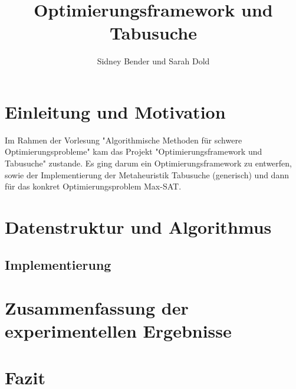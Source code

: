 \documentclass{article}
\begin{document}
\title{Optimierungsframework und Tabusuche}

\author{Sidney Bender und Sarah Dold}

\maketitle
\tableofcontents{}









\section{Einleitung und Motivation}
Im Rahmen der Vorlesung "Algorithmische Methoden für schwere Optimierungsprobleme" kam das Projekt "Optimierungsframework und Tabusuche" zustande.
Es ging darum ein Optimierungsframework zu entwerfen, sowie der Implementierung der Metaheuristik Tabusuche (generisch) und dann für das konkret Optimierungsproblem Max-SAT.

\section{Datenstruktur und Algorithmus}

\subsection{Implementierung}

\section{Zusammenfassung der experimentellen Ergebnisse}

\section{Fazit}
\end{document}
